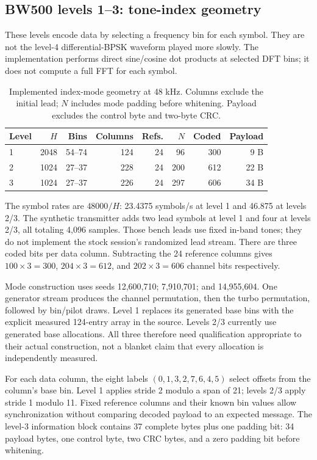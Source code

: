 \subsection{BW500 levels 1--3: tone-index geometry}
These levels encode data by selecting a frequency bin for each symbol. They
are not the level-4 differential-BPSK waveform played more slowly. The
implementation performs direct sine/cosine dot products at selected DFT bins;
it does not compute a full FFT for each symbol.

\begin{table}[htbp]
\centering\small
\begin{tabular}{@{}lrrrrrrr@{}}
\toprule
Level & $H$ & Bins & Columns & Refs. & $N$ & Coded & Payload\\
\midrule
1 & 2048 & 54--74 & 124 & 24 & 96 & 300 & 9 B\\
2 & 1024 & 27--37 & 228 & 24 & 200 & 612 & 22 B\\
3 & 1024 & 27--37 & 226 & 24 & 297 & 606 & 34 B\\
\bottomrule
\end{tabular}
\caption{Implemented index-mode geometry at 48 kHz. Columns exclude the initial lead; $N$ includes mode padding before whitening. Payload excludes the control byte and two-byte CRC.}
\label{tab:dsp-index-geometry}
\end{table}

The symbol rates are $48000/H$: 23.4375 symbols/s at level 1 and 46.875 at
levels 2/3. The synthetic transmitter adds two lead symbols at level 1 and four
at levels 2/3, all totaling 4,096 samples. Those bench leads use fixed in-band
tones; they do not implement the stock session's randomized lead stream.
There are three coded bits per data column. Subtracting the 24 reference
columns gives $100\times3=300$, $204\times3=612$, and $202\times3=606$
channel bits respectively.

Mode construction uses seeds 12,600,710; 7,910,701; and 14,955,604. One generator
stream produces the channel permutation, then the turbo permutation, followed
by bin/pilot draws. Level 1 replaces its generated base bins with the explicit
measured 124-entry array in the source. Levels 2/3 currently use generated
base allocations. All three therefore need qualification appropriate to their
actual construction, not a blanket claim that every allocation is independently
measured.

For each data column, the eight labels $(0,1,3,2,7,6,4,5)$ select offsets from
the column's base bin. Level 1 applies stride 2 modulo a span of 21; levels
2/3 apply stride 1 modulo 11. Fixed reference columns and their known bin
values allow synchronization without comparing decoded payload to an expected
message. The level-3 information block contains 37 complete bytes plus one
padding bit: 34 payload bytes, one control byte, two CRC bytes, and a zero
padding bit before whitening.

